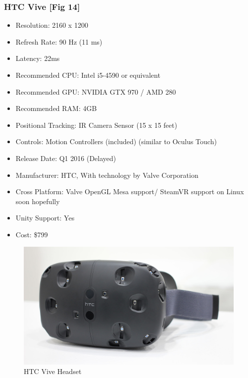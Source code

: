 \documentclass[a4paper,10pt]{article}
\begin{document}
\subsubsection{HTC Vive [Fig 14]}
	\begin{itemize}
	  \item Resolution: 2160 x 1200
	  \item Refresh Rate: 90 Hz (11 ms)
	  \item Latency: 22ms
	  \item Recommended CPU: Intel i5-4590 or equivalent
	  \item Recommended GPU: NVIDIA GTX 970 / AMD 280 
	  \item Recommended RAM: 4GB
	  \item Positional Tracking: IR Camera Sensor (15 x 15 feet)
	  \item Controls: Motion Controllers (included) (similar to Oculus Touch)  
	  \item Release Date: Q1 2016 (Delayed)
	  \item Manufacturer: HTC, With technology by Valve Corporation
	  \item Cross Platform: Valve OpenGL Mesa support/ SteamVR support on Linux soon hopefully
	  \item Unity Support: Yes
	  \item Cost: \$799
	\end{itemize}
	\begin{figure}[H]
	\includegraphics[width=\linewidth,height=\paperheight,keepaspectratio]{vive.jpg}
	\caption{HTC Vive Headset}
	\label{fig:ViveImg}
	\end{figure}
	\pagebreak
\end{document}
